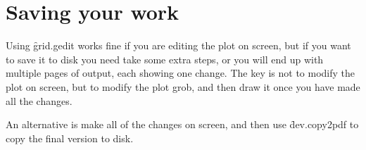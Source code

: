 % 
% 
% 
% 


\section{Saving your work} 
\label{sec:grid-save}

Using \f{grid.gedit} works fine if you are editing the plot on screen, but if you want to save it to disk you need take some extra steps, or you will end up with multiple pages of output, each showing one change.  The key is not to modify the plot on screen, but to modify the plot grob, and then draw it once you have made all the changes.  

% 
% 


An alternative is make all of the changes on screen, and then use \f{dev.copy2pdf} to copy the final version to disk.


